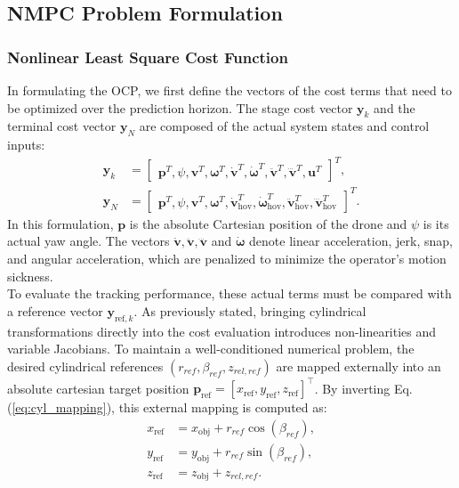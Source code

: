 \subsection{NMPC Problem Formulation}
\subsubsection{Nonlinear Least Square Cost Function}
In formulating the OCP, we first define the vectors of the cost terms that need to be optimized over the prediction horizon. The stage cost vector $\mathbf{y}_k$ and the terminal cost vector $\mathbf{y}_N$ are composed of the actual system states and control inputs:
\begin{align}
    \mathbf{y}_k &= \begin{bmatrix} \mathbf{p}^T, \psi, \mathbf{v}^T, \boldsymbol{\omega}^T, \dot{\mathbf{v}}^T, \dot{\boldsymbol{\omega}}^T, \ddot{\mathbf{v}}^T, \dddot{\mathbf{v}}^T, \mathbf{u}^T \end{bmatrix}^T, \\
    \mathbf{y}_N &= \begin{bmatrix} \mathbf{p}^T, \psi, \mathbf{v}^T, \boldsymbol{\omega}^T, \dot{\mathbf{v}}_{\text{hov}}^T, \dot{\boldsymbol{\omega}}_{\text{hov}}^T, \ddot{\mathbf{v}}_{\text{hov}}^T, \dddot{\mathbf{v}}_{\text{hov}}^T \end{bmatrix}^T.
\end{align}
In this formulation, $\mathbf{p}$ is the absolute Cartesian position of the drone and $\psi$ is its actual yaw angle. The vectors $\dot{\mathbf{v}}, \ddot{\mathbf{v}}, \dddot{\mathbf{v}}$ and $\dot{\boldsymbol{\omega}}$ denote linear acceleration, jerk, snap, and angular acceleration, which are penalized to minimize the operator's motion sickness.
\\To evaluate the tracking performance, these actual terms must be compared with a reference vector $\mathbf{y}_{\text{ref},k}$. As previously stated, bringing cylindrical transformations directly into the cost evaluation introduces non-linearities and variable Jacobians. To maintain a well-conditioned numerical problem, the desired cylindrical references $(r_{ref}, \beta_{ref}, z_{rel,ref})$ are mapped externally into an absolute cartesian target position $\mathbf{p}_{\text{ref}} = [x_{\text{ref}}, y_{\text{ref}}, z_{\text{ref}}]^\top$. By inverting Eq. (\ref{eq:cyl_mapping}), this external mapping is computed as:
\begin{align}
    x_{\text{ref}} &= x_{\text{obj}} + r_{ref} \cos(\beta_{ref}), \\
    y_{\text{ref}} &= y_{\text{obj}} + r_{ref} \sin(\beta_{ref}), \\
    z_{\text{ref}} &= z_{\text{obj}} + z_{rel,ref}.
\end{align}
